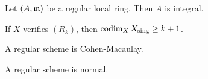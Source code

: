     \begin{proposition}
        Let $(A,{\mathfrak{m}})$ be a regular local ring.
        Then $A$ is integral.
    \end{proposition}

    \begin{proposition}
        If $X$ verifies $(R_k)$, then $\operatorname{codim}_X X_{\text{sing}} \geq k+1$.
    \end{proposition}

    \begin{proposition}
        A regular scheme is Cohen-Macaulay.
    \end{proposition}

    \begin{corollary}
        A regular scheme is normal.
    \end{corollary}



